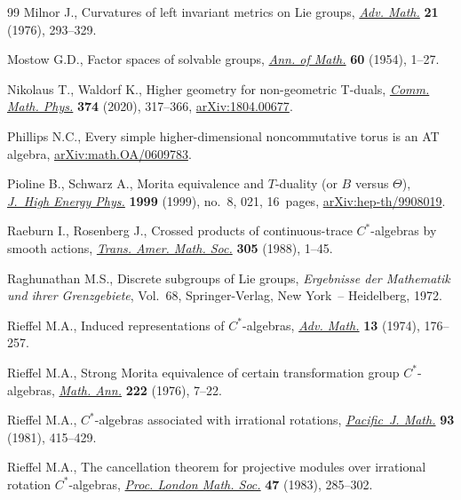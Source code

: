 \begin{thebibliography}{99}
Milnor J., Curvatures of left invariant metrics on {L}ie groups, \href{https://doi.org/10.1016/S0001-8708(76)80002-3}{\textit{Adv.
 Math.}} \textbf{21} (1976), 293--329.

Mostow G.D., Factor spaces of solvable groups, \href{https://doi.org/10.2307/1969700}{\textit{Ann. of Math.}}
 \textbf{60} (1954), 1--27.

Nikolaus T., Waldorf K., Higher geometry for non-geometric {T}-duals,
 \href{https://doi.org/10.1007/s00220-019-03496-3}{\textit{Comm. Math. Phys.}} \textbf{374} (2020), 317--366,
 \href{https://arxiv.org/abs/1804.00677}{arXiv:1804.00677}.

Phillips N.C., Every simple higher-dimensional noncommutative torus is an AT
 algebra, \href{https://arxiv.org/abs/math.OA/0609783}{arXiv:math.OA/0609783}.

Pioline B., Schwarz A., Morita equivalence and {$T$}-duality (or {$B$} versus
 {$\Theta$}), \href{https://doi.org/10.1088/1126-6708/1999/08/021}{\textit{J.~High Energy Phys.}} \textbf{1999} (1999), no.~8, 021,
 16~pages, \href{https://arxiv.org/abs/hep-th/9908019}{arXiv:hep-th/9908019}.

Raeburn I., Rosenberg J., Crossed products of continuous-trace
 {$C^\ast$}-algebras by smooth actions, \href{https://doi.org/10.2307/2001039}{\textit{Trans. Amer. Math. Soc.}}
 \textbf{305} (1988), 1--45.

Raghunathan M.S., Discrete subgroups of {L}ie groups, \textit{Ergebnisse der
 Mathematik und ihrer Grenzgebiete}, Vol.~68, Springer-Verlag, New York~--
 Heidelberg, 1972.

Rieffel M.A., Induced representations of {$C^{\ast}$}-algebras, \href{https://doi.org/10.1016/0001-8708(74)90068-1}{\textit{Adv.
 Math.}} \textbf{13} (1974), 176--257.

Rieffel M.A., Strong {M}orita equivalence of certain transformation group
 {$C^*$}-algebras, \href{https://doi.org/10.1007/BF01418238}{\textit{Math. Ann.}} \textbf{222} (1976), 7--22.

Rieffel M.A., {$C^{\ast} $}-algebras associated with irrational rotations,
 \href{https://doi.org/10.2140/pjm.1981.93.415}{\textit{Pacific~J. Math.}} \textbf{93} (1981), 415--429.

Rieffel M.A., The cancellation theorem for projective modules over irrational
 rotation {$C^{\ast} $}-algebras, \href{https://doi.org/10.1112/plms/s3-47.2.285}{\textit{Proc. London Math. Soc.}} \textbf{47}
 (1983), 285--302.


\end{thebibliography}
